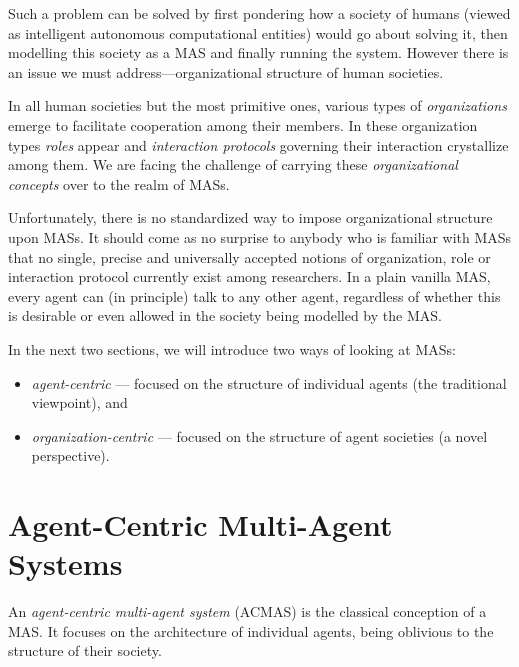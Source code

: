 Such a problem can be solved by first pondering how a society of humans (viewed as intelligent autonomous computational entities) would go about solving it, then modelling this society as a MAS and finally running the system.
However there is an issue we must address---organizational structure of human societies.

In all human societies but the most primitive ones, various types of \textit{organizations} emerge to facilitate cooperation among their members.
In these organization types \textit{roles} appear and \textit{interaction protocols} governing their interaction crystallize among them.
We are facing the challenge of carrying these \textit{organizational concepts} over to the realm of MASs.

Unfortunately, there is no standardized way to impose organizational structure upon MASs.
It should come as no surprise to anybody who is familiar with MASs that no single, precise and universally accepted notions of organization, role or interaction protocol currently exist among researchers.
In a plain vanilla MAS, every agent can (in principle) talk to any other agent, regardless of whether this is desirable or even allowed in the society being modelled by the MAS.

In the next two sections, we will introduce two ways of looking at MASs:
\begin{itemize} %
	\item \textit{agent-centric} --- focused on the structure of individual agents (the traditional viewpoint), and
	\item \textit{organization-centric} --- focused on the structure of agent societies (a novel perspective).
\end{itemize}

\section{Agent-Centric Multi-Agent Systems}

An \textit{agent-centric multi-agent system} (ACMAS) is the classical conception of a MAS.
It focuses on the architecture of individual agents, being oblivious to the structure of their society.


